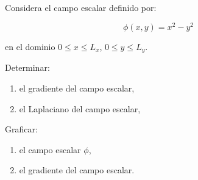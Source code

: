 \documentclass[./../main.tex]{subfiles}
\begin{document}
    \section{}
    
    Considera el campo escalar definido por:

    \begin{equation*}
        \phi(x, y) = x^{2} - y^{2}
    \end{equation*}

    en el dominio \(0 \leq x \leq L_{x}\), \(0 \leq y \leq L_{y}\).

    Determinar:

    \begin{enumerate}[label=\arabic*)]
        \item el gradiente del campo escalar,
        \item el Laplaciano del campo escalar,
    \end{enumerate}

    Graficar:
    \begin{enumerate}[label=\arabic*), resume]
        \item el campo escalar \(\phi\),
        \item el gradiente del campo escalar.
    \end{enumerate}
\end{document}

